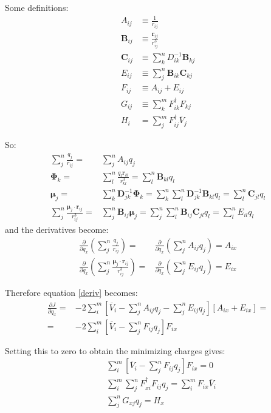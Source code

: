 \documentclass[a4paper]{report}
\newcommand{\bs}{\boldsymbol}
\begin{document}
Some definitions:
\begin{align}
A_{ij} &\equiv \frac{1}{r_{ij}} \\
\bs{B}_{ij} &\equiv \frac{\bs{r}_{ij}}{r_{ij}^3} \\
\bs{C}_{ij} &\equiv \sum_k^n D^{-1}_{ik}\bs{B}_{kj} \\
E_{ij} &\equiv \sum_j^n \bs{B}_{ik} \bs{C}_{kj} \\
F_{ij} &\equiv A_{ij} + E_{ij} \\
G_{ij} &\equiv \sum_k^m F_{ik}^\dagger F_{kj} \\
H_i &= \sum_j^m F_{ij}^\dagger \overline{V}_j 
\end{align}

So:
\begin{align}
\sum_j^n \frac{q_j}{r_{ij}} =& \sum_j^n A_{ij} q_j \\
\bs{\Phi}_k =& \sum_l^n \frac{q_l \bs{r}_{kl}}{r_{kl}^3} = \sum_l^n \bs{B}_{kl} q_l \\
\bs{\mu}_j =& \sum_k^n \bs{D}^{-1}_{jk} \bs{\Phi}_k = \sum_k^n \sum_l^n
\bs{D}^{-1}_{jk} \bs{B}_{kl} q_l = \sum_l^n \bs{C}_{jl} q_l \\
\sum_j^n \frac{\bs{\mu}_j \cdot \bs{r}_{ij}}{r_{ij}^3} =& \sum_j^n \bs{B}_{ij}
\bs{\mu}_j = \sum_j^n \sum_l^n \bs{B}_{ij} \bs{C}_{jl} q_l = \sum_l^n E_{il} q_l
\end{align}
and the derivatives become:
\begin{align}
\frac{\partial}{\partial q_x} \left(\sum_j^n \frac{q_j}{r_{ij}}\right) =&
\frac{\partial}{\partial q_x} \left(\sum_j^n A_{ij} q_j\right) = A_{ix} \\
\frac{\partial}{\partial q_x} \left(\sum_j^n \frac{\bs{\mu}_j \cdot
\bs{r}_{ij}}{r_{ij}^3} \right) =& \frac{\partial}{\partial q_x} \left(\sum_j^n E_{ij}
q_j \right) = E_{ix}
\end{align}

Therefore equation \ref{deriv} becomes:
\begin{align}
\frac{\partial J}{\partial q_x} =& - 2 \sum_i^m \left[ \overline{V}_i - \sum_j^n
A_{ij} q_j - \sum_j^n E_{ij} q_j \right] \left[ A_{ix} + E_{ix} \right] = \nonumber \\
\label{E:A}
=& -2\sum_i^m \left[ \overline{V}_i - \sum_j^n F_{ij} q_j\right] F_{ix}
\end{align}

Setting this to zero to obtain the minimizing charges gives:
\begin{align}
\label{E:B}
&\sum_i^m \left[\overline{V}_i - \sum_j^n F_{ij} q_j \right] F_{ix} = 0 \\
&\sum_i^m \sum_j^n F_{xi}^\dagger F_{ij} q_j = \sum_i^m F_{ix} \overline{V}_i \\
\label{E:C}
&\sum_j^n G_{xj} q_j = H_x
\end{align}
\end{document}
